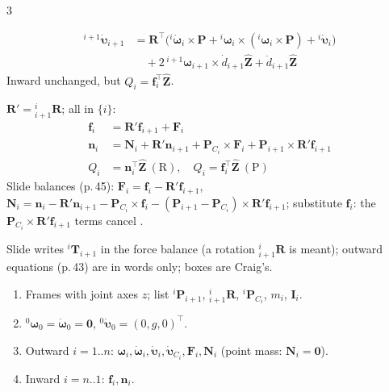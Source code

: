 \begin{multicols}{3}
\begin{fbx}
\begin{align*}
{}^{i+1}\dot{\boldsymbol\upsilon}_{i+1}&=\mathbf R^\top\big({}^i\dot{\boldsymbol\omega}_i\times\mathbf P+{}^i\boldsymbol\omega_i\times({}^i\boldsymbol\omega_i\times\mathbf P)+{}^i\dot{\boldsymbol\upsilon}_i\big)\\&\quad+2\,{}^{i+1}\boldsymbol\omega_{i+1}\times\dot d_{i+1}\hat{\mathbf Z}+\ddot d_{i+1}\hat{\mathbf Z}
\end{align*}
Inward unchanged, but $Q_i=\mathbf f_i^\top\hat{\mathbf Z}$.
\end{fbx}
\begin{fbx}[Inward, $i=n\to1$, $\mathbf f_{n+1}=\mathbf n_{n+1}=\mathbf 0$ \pg{44--45}]
$\mathbf R'={}^i_{i+1}\mathbf R$; all in $\{i\}$:
\begin{align*}
\mathbf f_i&=\mathbf R'\mathbf f_{i+1}+\mathbf F_i\\
\mathbf n_i&=\mathbf N_i+\mathbf R'\mathbf n_{i+1}+\mathbf P_{C_i}\times\mathbf F_i+\mathbf P_{i+1}\times\mathbf R'\mathbf f_{i+1}\\
Q_i&=\mathbf n_i^\top\hat{\mathbf Z}\ (\text{R}),\quad Q_i=\mathbf f_i^\top\hat{\mathbf Z}\ (\text{P})
\end{align*}
Slide balances (p.\,45): $\mathbf F_i=\mathbf f_i-\mathbf R'\mathbf f_{i+1}$, $\mathbf N_i=\mathbf n_i-\mathbf R'\mathbf n_{i+1}-\mathbf P_{C_i}\times\mathbf f_i-(\mathbf P_{i+1}-\mathbf P_{C_i})\times\mathbf R'\mathbf f_{i+1}$; substitute $\mathbf f_i$: the $\mathbf P_{C_i}\times\mathbf R'\mathbf f_{i+1}$ terms cancel \added.
\end{fbx}
\begin{slideerr}[NE, p.\,45]
Slide writes ${}^i\mathbf T_{i+1}$ in the force balance (a rotation ${}^i_{i+1}\mathbf R$ is meant); outward equations (p.\,43) are in words only; boxes are Craig's.
\end{slideerr}
\begin{recipe}
\begin{enumerate}
\item Frames with joint axes $z$; list ${}^i\mathbf P_{i+1}$, ${}^i_{i+1}\mathbf R$, ${}^i\mathbf P_{C_i}$, $m_i$, $\mathbf I_i$.
\item ${}^0\boldsymbol\omega_0=\dot{\boldsymbol\omega}_0=\mathbf 0$, ${}^0\dot{\boldsymbol\upsilon}_0=(0,g,0)^\top$.
\item Outward $i=1..n$: $\boldsymbol\omega_i,\dot{\boldsymbol\omega}_i,\dot{\boldsymbol\upsilon}_i,\dot{\boldsymbol\upsilon}_{C_i},\mathbf F_i,\mathbf N_i$ (point mass: $\mathbf N_i=\mathbf 0$).
\item Inward $i=n..1$: $\mathbf f_i,\mathbf n_i$.

\end{enumerate}
\end{recipe}
\end{multicols}
